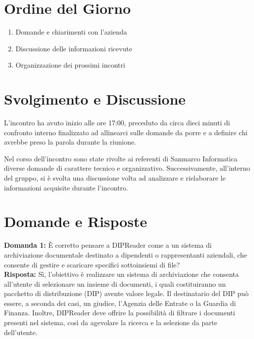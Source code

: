 \documentclass[a4paper,12pt]{article}
\begin{document}
\section{Ordine del Giorno}
\begin{enumerate}
    \item Domande e chiarimenti con l'azienda  
    \item Discussione delle informazioni ricevute 
    \item Organizzazione dei prossimi incontri
\end{enumerate}
\vspace{0.5cm}
\section{Svolgimento e Discussione}
L’incontro ha avuto inizio alle ore 17:00, preceduto da circa dieci minuti di confronto interno finalizzato ad allinearci sulle domande da porre e a definire chi avrebbe preso la parola durante la riunione.

Nel corso dell’incontro sono state rivolte ai referenti di Sanmarco Informatica diverse domande di carattere tecnico e organizzativo.
Successivamente, all’interno del gruppo, si è svolta una discussione volta ad analizzare e rielaborare le informazioni acquisite durante l’incontro.

\vspace{0.5cm}

\section{Domande e Risposte}

\textbf{Domanda 1:} È corretto pensare a DIPReader come a un sistema di archiviazione documentale destinato a dipendenti o rappresentanti aziendali, che consente di gestire e scaricare specifici sottoinsiemi di file? \\[0.5em]
\textbf{Risposta:} Sì, l’obiettivo è realizzare un sistema di archiviazione che consenta all’utente di selezionare un insieme di documenti, i quali costituiranno un pacchetto di distribuzione (DIP) avente valore legale.
Il destinatario del DIP può essere, a seconda dei casi, un giudice, l’Agenzia delle Entrate o la Guardia di Finanza.
Inoltre, DIPReader deve offrire la possibilità di filtrare i documenti presenti nel sistema, così da agevolare la ricerca e la selezione da parte dell’utente.

\vspace{2em}
\end{document}
